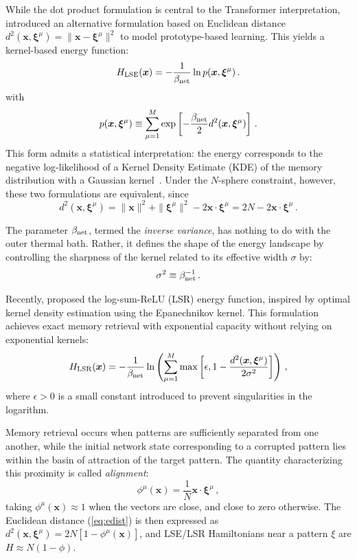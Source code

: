 \documentclass{article}
\theoremstyle{plain}
\theoremstyle{definition}
\theoremstyle{remark}
\begin{document}
While the dot product formulation is central to the Transformer interpretation, \citet{krotov2021large} introduced an alternative formulation based on Euclidean distance $d^2(\bm{x}, \bm{\xi}^\mu) = \|\bm{x}-\bm{\xi}^\mu\|^2$ to model prototype-based learning. This yields a kernel-based energy function:
\begin{equation}
    H_{\rm LSE}(\bm{x}) = -\frac{1}{\beta_{\rm net}} \ln p(\bm{x}, \bm{\xi}^\mu) \,.
    \label{eq:H_lse}
\end{equation}
with 
\begin{equation}
    p(\bm{x}, \bm{\xi}^\mu) \equiv \sum_{\mu=1}^M \exp\left[ - \frac{\beta_{\rm net}}{2} d^2(\bm{x}, \bm{\xi}^\mu) \right] \,.
    \label{eq:dens}
\end{equation}
This form admits a statistical interpretation: the energy corresponds to the negative log-likelihood of a Kernel Density Estimate (KDE) of the memory distribution with a Gaussian kernel~\cite{hoover2025dense}. Under the $N$-sphere constraint, however, these two formulations are  equivalent, since 
\begin{equation}
    d^2(\bm{x}, \bm{\xi}^\mu) = \|\bm{x}\|^2 + \|\bm{\xi}^\mu\|^2 - 2\bm{x} \cdot \bm{\xi}^\mu = 2N - 2\bm{x} \cdot \bm{\xi}^\mu \,.
    \label{eq:edist}
\end{equation}

The parameter $\beta_{\rm net}$, termed the {\it inverse variance}, has nothing to do with the outer thermal bath. Rather, it defines the shape of the energy landscape by controlling the sharpness of the kernel related to its effective width $\sigma$ by:
\begin{equation}
    \sigma^2 \equiv \beta_{\rm net}^{-1} \,.
\end{equation}

Recently, \citet{hoover2025dense} proposed the log-sum-ReLU (LSR) energy function, inspired by optimal kernel density estimation using the Epanechnikov kernel. This formulation achieves exact memory retrieval with exponential capacity without relying on exponential kernels:
\begin{equation}
    H_{\rm LSR}(\bm{x}) = -\frac{1}{\beta_{\rm net}} \ln \left( \sum_{\mu=1}^M \max\left[\epsilon,  1 - \frac{d^2(\bm{x},\bm{\xi}^\mu)}{2\sigma^2} \right] \right) \,,
    \label{eq:H_lsr}
\end{equation}
where $\epsilon > 0$ is a small constant introduced to prevent singularities in the logarithm.

Memory retrieval occurs when patterns are sufficiently separated from one another, while the initial network state corresponding to a corrupted pattern lies within the basin of attraction of the target pattern. The quantity characterizing this proximity is called \textit{alignment}:
\begin{equation}
    \phi^\mu(\bm{x}) = \frac{1}{N} \bm{x} \cdot \bm{\xi}^\mu\,,
    \label{eq:alignment}
\end{equation}
taking $\phi^\mu(\bm{x}) \approx 1$ when the vectors are close, and close to zero otherwise. The Euclidean distance (\ref{eq:edist}) is then expressed as $d^2(\bm{x}, \bm{\xi}^\mu) =2N [1- \phi^\mu(\bm{x}) ]$, and 
LSE/LSR Hamiltonians near a pattern $\xi$ are $H\approx N(1-\phi)$.
\end{document}
